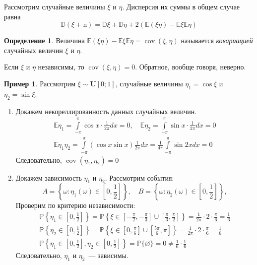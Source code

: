 \documentclass[oneside,final,14pt]{extreport}
\theoremstyle{plain}
\theoremstyle{definition}
\newtheorem*{defn}{Определение}
\newtheorem*{exmp}{Пример}
\theoremstyle{named}
\begin{document}
Рассмотрим случайные величины $\xi$ и $\eta$. Дисперсия их суммы в общем случае равна
\begin{equation*}
    \mathbb{D}(\xi+\mathrm{n})=\mathbb{D} \xi+\mathbb{D} \eta+2(\mathbb{E}(\xi \eta)-\mathbb{E} \xi \mathbb{E} \eta)
\end{equation*}
\begin{defn}
    Величина $\mathbb{E}(\xi \eta)-\mathbb{E} \xi \mathbb{E} \eta = \operatorname{cov}(\xi, \eta)$ называется {\it ковариацией} случайных величин $\xi$ и $\eta$.
\end{defn}
Если $\xi$ и $\eta$ независимы, то $\operatorname{cov}(\xi, \eta) = 0$. Обратное, вообще говоря, неверно.
\begin{exmp}
    Рассмотрим $\xi \sim \mathbf{U}[0;1]$, случайные величины $\eta_{1}=\cos \xi$ и $\eta_{2}=\sin \xi$.
    \begin{enumerate}
        \item Докажем некореллированность данных случайных величин.
        \begin{gather*}
            \mathbb{E} \eta_{1}=\int\limits_{-\pi}^{\pi} \cos x \cdot \frac{1}{2 \pi} d x=0, \quad \mathbb{E} \eta_{2}=\int\limits_{-\pi}^{\pi} \sin x \cdot \frac{1}{2 \pi} d x=0 \\
            \mathbb{E} \eta_{1} \eta_{2}=\int\limits_{-\pi}^{\pi}(\cos x \sin x) \frac{1}{2 \pi} d x=\frac{1}{4 \pi} \int\limits_{-\pi}^{\pi} \sin 2 x d x=0
        \end{gather*}
        Следовательно, $\operatorname{cov}(\eta_1, \eta_2) = 0$
        \item Докажем зависимость $\eta_1$ и $\eta_2$. Рассмотрим события:
        \begin{equation*}
            A = \left\{\omega \colon \eta_1(\omega) \in \left[0, \frac{1}{2} \right] \right\}, \quad
            B = \left\{\omega \colon \eta_2(\omega) \in \left[0, \frac{1}{2} \right] \right\},
        \end{equation*}
        Проверим по критерию независимости:
        \begin{gather*}
            \mathbb{P}\left\{\eta_{1} \in\left[0, \frac{1}{2}\right]\right\}=\mathbb{P}\left\{\xi \in\left[-\frac{\pi}{2},-\frac{\pi}{3}\right] \cup\left[\frac{\pi}{3}, \frac{\pi}{2}\right]\right\}=\frac{1}{2 \pi} \cdot 2 \cdot \frac{\pi}{6}=\frac{1}{6} \\
            \mathbb{P}\left\{\eta_{2} \in\left[0, \frac{1}{2}\right]\right\}=\mathbb{P}\left\{\xi \in\left[0, \frac{\pi}{6}\right] \cup\left[\frac{5 \pi}{6}, \pi\right]\right\}=\frac{1}{2 \pi} \cdot 2 \cdot \frac{\pi}{6}=\frac{1}{6} \\
            \mathbb{P}\left\{\eta_{1} \in\left[0, \frac{1}{2}\right], \eta_{2} \in\left[0, \frac{1}{2}\right]\right\}=\mathbb{P}\{\varnothing\}=0 \neq \frac{1}{6} \cdot \frac{1}{6}
        \end{gather*}
        Следовательно, $\eta_1$ и $\eta_2$~--- зависимы.
    \end{enumerate}
\end{exmp}
\end{document}
